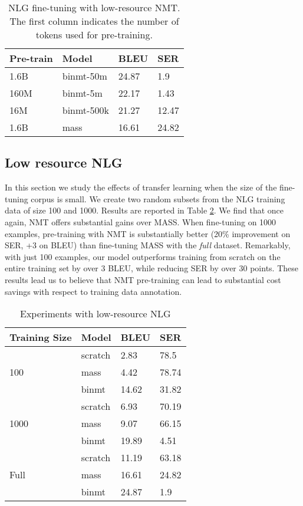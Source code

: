 \documentclass[11pt,a4paper]{article}
\begin{document}
\begin{table}[]
\centering
\begin{tabular}{l|l|l|l}
\hline
Pre-train & Model & BLEU   & SER    \\ \hline
1.6B & binmt-50m             & 24.87 & 1.9   \\
160M & binmt-5m             & 22.17 & 1.43  \\
16M & binmt-500k             & 21.27 & 12.47 \\ 
1.6B & mass                & 16.61 & 24.82 \\
\hline

\end{tabular}
\caption{NLG fine-tuning with low-resource NMT. The first column indicates the number of tokens used for pre-training.}
\label{results-nmt}
\end{table}



\subsection{Low resource NLG} \label{low-nlg}
In this section we study the effects of transfer learning when the size of the fine-tuning corpus is small. We create two random subsets from the NLG training data of size 100 and 1000. Results are reported in Table \ref{results-nlg}. We find that once again, NMT offers substantial gains over MASS.
When fine-tuning on 1000 examples, pre-training with NMT is substantially better (20\% improvement on SER, +3 on BLEU) than fine-tuning MASS with the \textit{full} dataset.
Remarkably, with just 100 examples, our model outperforms  training from scratch on the entire training set by over 3 BLEU, while reducing SER by over 30 points. These results lead us to believe that NMT pre-training can lead to substantial cost savings with respect to training data annotation.

\begin{table}[]
\centering
\begin{tabular}{l|l|ll} 
\hline
Training Size    & Model & BLEU   & SER    \\ \hline

& scratch                   & 2.83  & 78.5 \\ 
100 & mass                      & 4.42  & 78.74 \\ 
& binmt                              & 14.62 & 31.82 \\ \hline


& scratch                   & 6.93  & 70.19 \\ 
1000 & mass                      & 9.07  & 66.15 \\ 
& binmt                             & 19.89 & 4.51  \\ \hline


& scratch         & 11.19 & 63.18  \\ 
Full & mass    & 16.61 & 24.82 \\ 
& binmt & 24.87 & 1.9 \\ \hline
\end{tabular}
\caption{Experiments with low-resource NLG}
\label{results-nlg}
\end{table}
\end{document}
